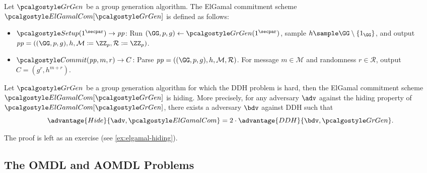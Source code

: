 \begin{definition}
  Let $\grgen$ be a group generation algorithm.
  The ElGamal commitment scheme $\algo{ElGamalCom}[\grgen]$ is defined as follows:
  \begin{itemize}
  \item $\algo{Setup}(1^\secpar) \rightarrow \params$: Run $\gparam \gets \grgen(1^\secpar)$, sample $h \sample \GG \setminus \{1_\GG\}$, and output $\params = (\gparam, h, \mathcal{M} \defeq \ZZ_p, \mathcal{R} \defeq \ZZ_p)$.
  \item $\algo{Commit}(\params, m, r) \rightarrow C$: Parse $\params = ((\GG, p, g), h, \mathcal{M}, \mathcal{R})$. For message $m \in \mathcal{M}$ and randomness $r \in \mathcal{R}$, output $C = (g^r, h^{m+r})$.
  \end{itemize}
\end{definition}

\begin{theorem}\label{thm:elgamal-hiding}
  Let $\grgen$ be a group generation algorithm for which the DDH problem is hard, then the ElGamal commitment scheme $\algo{ElGamalCom}[\grgen]$ is hiding.
  More precisely, for any \ppt adversary $\adv$ against the hiding property of $\algo{ElGamalCom}[\grgen]$, there exists a \ppt adversary $\bdv$ against DDH such that
  \[
  \advantage{Hide}{\adv, \algo{ElGamalCom}} = 2 \cdot \advantage{DDH}{\bdv, \grgen}.
  \]
\end{theorem}

The proof is left as an exercise (see \autoref{ex:elgamal-hiding}).

\subsection{The OMDL and AOMDL Problems}

